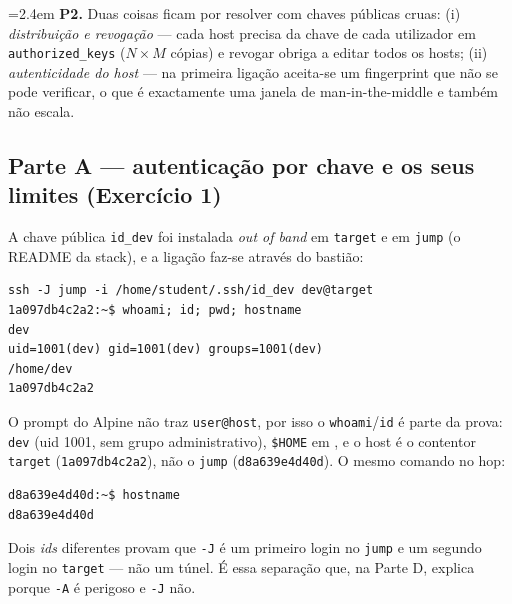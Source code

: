 \documentclass[a4paper,11pt]{article}
\newenvironment{answer}[1]{%
  \par\addvspace{7pt}\noindent
  \hangindent=2.4em\hangafter=1
  {\color{sscnblue}\bfseries #1\hspace{0.55em}}\ignorespaces}
  {\par\addvspace{5pt}}
\newcommand{\cmd}[1]{\textcolor{sscnblue}{\texttt{#1}}}
\newcommand{\file}[1]{\texttt{\detokenize{#1}}}
\begin{document}
\begin{answer}{P2.}
Duas coisas ficam por resolver com chaves p\'ublicas cruas: (i) \emph{distribui\c{c}\~ao
e revoga\c{c}\~ao} --- cada host precisa da chave de cada utilizador em
\cmd{authorized\_keys} ($N\times M$ c\'opias) e revogar obriga a editar todos os hosts;
(ii) \emph{autenticidade do host} --- na primeira liga\c{c}\~ao aceita-se um fingerprint
que n\~ao se pode verificar, o que \'e exactamente uma janela de man-in-the-middle e
tamb\'em n\~ao escala.
\end{answer}



\subsection{Parte A --- autentica\c{c}\~ao por chave e os seus limites (Exerc\'icio 1)}

A chave p\'ublica \cmd{id\_dev} foi instalada \emph{out of band} em \cmd{target} e em
\cmd{jump} (o README da stack), e a liga\c{c}\~ao faz-se atrav\'es do basti\~ao:

\begin{lstlisting}
ssh -J jump -i /home/student/.ssh/id_dev dev@target
1a097db4c2a2:~$ whoami; id; pwd; hostname
dev
uid=1001(dev) gid=1001(dev) groups=1001(dev)
/home/dev
1a097db4c2a2
\end{lstlisting}

O prompt do Alpine n\~ao traz \cmd{user@host}, por isso o \cmd{whoami}/\cmd{id} \'e parte
da prova: \cmd{dev} (uid 1001, sem grupo administrativo), \cmd{\$HOME} em
\file{/home/dev}, e o host \'e o contentor \cmd{target} (\cmd{1a097db4c2a2}), n\~ao o
\cmd{jump} (\cmd{d8a639e4d40d}). O mesmo comando no hop:

\begin{lstlisting}
d8a639e4d40d:~$ hostname
d8a639e4d40d
\end{lstlisting}

Dois \emph{ids} diferentes provam que \cmd{-J} \'e um primeiro login no \cmd{jump} e um
segundo login no \cmd{target} --- n\~ao um t\'unel. \'E essa separa\c{c}\~ao que, na Parte
D, explica porque \cmd{-A} \'e perigoso e \cmd{-J} n\~ao.
\end{document}
